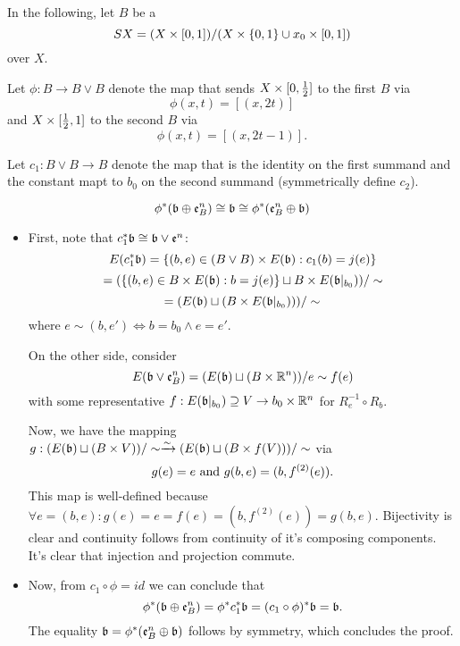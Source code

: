 \begin{myparagraph}
    In the following, let $B$ be a 
    \[ SX = (X \times [0, 1]) / (X \times \{ 0, 1 \} \cup x_0 \times [0, 1])\]
    over $X$.

    Let $\phi: B \to B \vee B$ denote the map that sends
    $X \times [0, \frac{1}{2}]$ to the first $B$ via
    \[ \phi(x, t) = [(x, 2t)] \]
    and $X \times [\frac{1}{2}, 1]$ to the second $B$ via
    \[ \phi(x, t) = [(x, 2t - 1)]. \]

    Let $c_1: B \vee B \to B$ denote the map that is the identity on the first summand
    and the constant mapt to $b_0$ on the second summand (symmetrically define $c_2$).
\end{myparagraph}

\begin{mylemma}\label{suspension::triviality}
    \[ \phi^*(\mathfrak{b} \oplus \mathfrak{e}^{n}_B) \cong \mathfrak{b} \cong \phi^*(\mathfrak{e}^{n}_B \oplus \mathfrak{b}) \]
\end{mylemma}
\begin{myproof}
    \begin{itemize}
        \item First, note that $c_1^*\mathfrak{b} \cong \mathfrak{b} \vee \mathfrak{e}^{n}$:
        \[ E(c_1^*\mathfrak{b}) = \{(b, e) \in (B \vee B) \times E(\mathfrak{b}):c_1(b) = j(e)\} \]
        \[ = (\{(b, e) \in B \times E(\mathfrak{b}):b = j(e)\} \sqcup B \times E(\mathfrak{b}\vert_{b_0})) / \sim \]
        \[ = (E(\mathfrak{b}) \sqcup (B \times E(\mathfrak{b}\vert_{b_0}))) / \sim\]
        where $e \sim (b, e') \iff b = b_0 \land e = e'$.
        
        On the other side, consider
        \[ E(\mathfrak{b} \vee \mathfrak{e}^{n}_B) = (E(\mathfrak{b}) \sqcup (B \times \mathbb{R}^n)) / e \sim f(e) \]
        with some representative $f: E(\mathfrak{b}\vert_{b_0}) \supseteq{} V \to b_0 \times \mathbb{R}^n$ for $R_e^{-1} \circ R_b$.
        
        Now, we have the mapping $g: (E(\mathfrak{b}) \sqcup (B \times V)) / \sim \xrightarrow{\sim} (E(\mathfrak{b}) \sqcup (B \times f(V))) / \sim$ via
        \[ g(e) = e \text{ and } g(b, e) = (b, f^{(2)}(e)). \]
        This map is well-defined because $\forall e = (b, e): g(e) = e = f(e) = (b, f^{(2)}(e)) = g(b, e)$.
        Bijectivity is clear and continuity follows from continuity of it's composing components.
        It's clear that injection and projection commute.
        \item Now, from $c_1 \circ \phi = id$ we can conclude that
        \[ \phi^*(\mathfrak{b} \oplus \mathfrak{e}^{n}_B) = \phi^*c_1^*\mathfrak{b} = (c_1 \circ \phi)^*\mathfrak{b} = \mathfrak{b}. \]
        The equality $\mathfrak{b} = \phi^*(\mathfrak{e}^{n}_B \oplus \mathfrak{b})$ follows by symmetry, which concludes the proof.
    \end{itemize}
\end{myproof}

